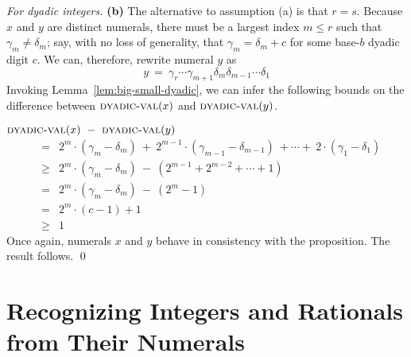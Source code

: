 \begin{proof}[For dyadic integers]
{\bf (b)} The alternative to assumption (a) is that $r = s$.  Because
$x$ and $y$ are distinct numerals, there must be a largest index $m
\leq r$ such that $\gamma_m \neq \delta_m$; say, with no loss of
generality, that $\gamma_m = \delta_m + c$ for some base-$b$ dyadic
digit $c$.  We can, therefore, rewrite numeral $y$ as
\[ y \ = \ \gamma_r \cdots \gamma_{m+1} \delta_m \delta_{m-1} \cdots \delta_1
\]
Invoking Lemma~\ref{lem:big-small-dyadic}, we can infer the following
bounds on the difference between $\mbox{\sc dyadic-val}(x)$ and
$\mbox{\sc dyadic-val}(y)$.

\bigskip

$\mbox{\sc dyadic-val}(x) \ - \ \mbox{\sc dyadic-val}(y)$
\begin{eqnarray*}
  & =  &
2^m \cdot (\gamma_m - \delta_m) \ + \ 2^{m-1} \cdot (\gamma_{m-1} -
\delta_{m-1}) \ + \cdots + \  2 \cdot (\gamma_1 - \delta_1) \\
  & \geq &
2^m \cdot (\gamma_m - \delta_m) \ - \ \left( 2^{m-1} + 2^{m-2} +
\cdots + 1 \right) \\
  & = &
2^m \cdot (\gamma_m - \delta_m)\ - \ \left( 2^m -1 \right) \\
  & = &
2^m \cdot (c-1) +1 \\
  & \geq & 1
\end{eqnarray*}
Once again, numerals $x$ and $y$ behave in consistency with the
proposition.  The result follows.
\qed
\end{proof}




\section{Recognizing Integers and  Rationals from Their Numerals}
\label{sec:special-numerals-N-Q}

